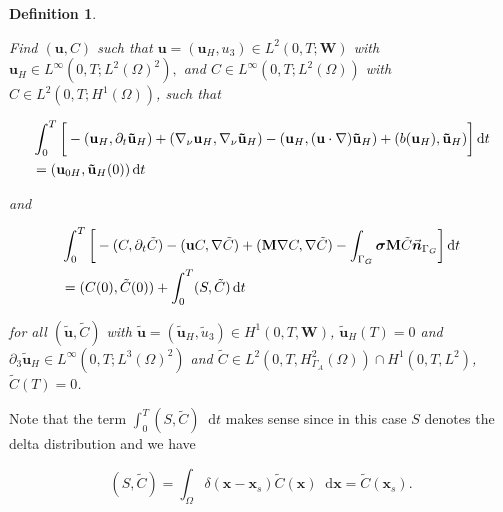 \documentclass[11pt]{article}
\newtheorem{definition}{Definition}
\newcommand*\diff{\mathop{}\!\mathrm{d}}
\begin{document}
  \begin{definition} \label{definitionhydrostaticWF}
  
  Find $(\mathbf{u}, C)$ such that $\mathbf{u} = (\mathbf{u}_H, u_3) \in L^2 (0, T; \mathbf{W})$ with $\mathbf{u}_H \in L^\infty (0,T; L^2(\Omega)^2),$ and $C \in L^\infty(0,T; L^2(\Omega))$ with $C \in L^2(0,T; H^1(\Omega))$, such that
  
  \begin{equation}
    \begin{split}
      & \int_0^T \bigg[ -(\mathbf{u}_H, \partial_t \mathbf{\tilde{u}}_H) + (\nabla_\nu \mathbf{u}_H, \nabla_\nu \mathbf{\tilde{u}}_H) - (\mathbf{u}_H, (\mathbf{u} \cdot \nabla) \mathbf{\tilde{u}}_H) + (b(\mathbf{u}_H), \mathbf{\tilde{u}}_H) \bigg ] \diff t \\
      & = (\mathbf{u}_{0H}, \mathbf{\tilde{u}}_H(0)) \diff t \raisetag{15pt}\label{hydrostaticWF_U}
    \end{split}
  \end{equation}
  
  and
  
    \begin{equation}
    \begin{split}
      & \int_0^T \bigg[ -(C, \partial_t \tilde{C}) -(\mathbf{u}C, \nabla \tilde{C}) +  (\mathbf{M} \nabla C, \nabla \tilde{C}) - \int_{\Gamma_G} \boldsymbol{\sigma} \mathbf{M} \tilde{C} \vec{\boldsymbol{n}}_{\Gamma_G} \bigg ] \diff t \\
      & = (C(0), \tilde{C}(0)) + \int_0^T (S,\tilde{C}) \diff t \raisetag{20pt} \label{hydrostaticWF_C}
    \end{split}
  \end{equation}
  
  for all $(\mathbf{\tilde{u}}, \tilde{C})$ with $\mathbf{\tilde{u}} = (\mathbf{\tilde{u}}_H, \tilde{u}_3) \in H^1 (0,T, \mathbf{W})$, $\mathbf{\tilde{u}}_H (T) = 0$ and $\partial_3 \mathbf{\tilde{u}}_H \in L^\infty (0, T; L^3 (\Omega)^2)$ and  $\tilde{C} \in L^2 (0,T, H^2_{\Gamma_A} (\Omega)) \cap H^1 (0,T, L^2)$, $\tilde{C} (T) = 0$. 
  
  \end{definition}
  
  Note that the term $\int_0^T (S,\tilde{C}) \diff t$ makes sense since in this case $S$ denotes the delta distribution and we have 
  
  \[ (S,\tilde{C}) = \int_\Omega \delta(\mathbf{x} - \mathbf{x}_s) \tilde{C}(\mathbf{x}) \diff \mathbf{x} = \tilde{C}(\mathbf{x}_s).\]
  
\end{document}
